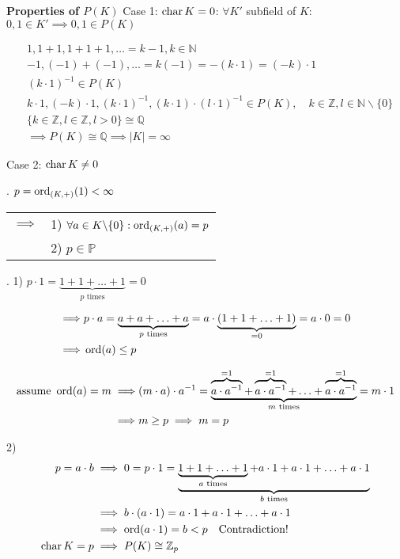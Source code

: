 \textbf{Properties of $P(K)$}
Case 1:
$\operatorname{char} K=0$:
$\forall K'$ subfield of $K$: $0,1 \in K' \implies 0,1 \in P(K)$

\begin{align*}
&1, 1+1, 1+1+1, \ldots = k-1, k \in \mathbb{N}\\
&-1, (-1)+(-1), \ldots = k(-1) = -(k\cdot 1) = (-k) \cdot 1\\
&(k\cdot 1)^{-1} \in P(K)\\
&k\cdot 1, (-k)\cdot 1,(k\cdot 1)^{-1}, (k\cdot 1)\cdot (l\cdot 1)^{-1} \in P(K), \quad k \in \mathbb{Z}, l \in \mathbb{N} \backslash \{0\}\\
&\{ k \in \mathbb{Z}, l \in \mathbb{Z}, l>0 \} \cong \mathbb{Q}\\
&\implies P(K) \cong \mathbb{Q} \implies |K|=\infty
\end{align*}

Case 2: $\operatorname{char} K \neq 0$

\Lemma.
$p = \operatorname{ord}_{(K,+)} (1) < \infty$
\begin{tabular}{ll}
$\implies$
  & 1) $\forall a \in K \backslash \{0\}: \operatorname{ord}_{(K,+)} (a) = p$\\
  & 2) $p \in \mathbb{P}$
\end{tabular}

\Proof.
1) $p\cdot 1 = \underbrace{1+1+ \ldots +1}_{p \text{ times}} = 0$

\begin{align*}
  \implies & p \cdot a = \underbrace{a+a+ \ldots +a}_{p\text{ times}} = a \cdot \underbrace{(1+1+ \ldots +1)}_{=0} = a\cdot 0 = 0 \\
  \implies & \operatorname{ord}(a) \leq p
\end{align*}

\begin{align*}
  \text{assume }\operatorname{ord}(a) = m \implies
  & (m\cdot a)\cdot a^{-1} =
    \underbrace{\overbrace{a\cdot a^{-1}}^{=1} + \overbrace{a\cdot a^{-1}}^{=1} + \ldots + \overbrace{a\cdot a^{-1}}^{=1}}_{m\text{ times}} = m\cdot 1 \\
  \implies & m \geq p \implies m = p
\end{align*}

2)
\begin{align*}
p=a\cdot b & \implies 0=p \cdot 1 = \underbrace{\underbrace{1 + 1 + \ldots + 1}_{a\text{ times}} + a\cdot 1 + a\cdot 1 + \ldots + a\cdot 1}_{b\text{ times}}\\
&\implies b \cdot (a \cdot 1) = a\cdot 1 + a\cdot 1 + \ldots + a\cdot 1\\
&\implies \operatorname{ord}(a\cdot 1)=b < p \quad \text{Contradiction!}\\
\operatorname{char} K=p &\implies P(K) \cong \mathbb{Z}_p
\end{align*}
